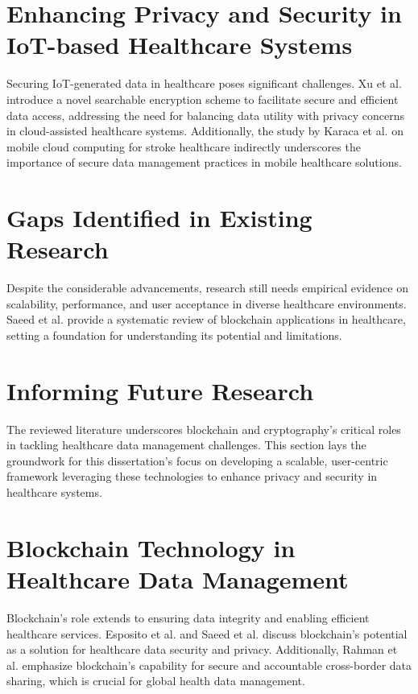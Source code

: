 \documentclass[cic,tc,english]{iiufrgs}
\begin{document}
\section{Enhancing Privacy and Security in IoT-based Healthcare Systems}
Securing IoT-generated data in healthcare poses significant challenges. Xu et al. \cite{XuChang2019} introduce a novel searchable encryption scheme to facilitate secure and efficient data access, addressing the need for balancing data utility with privacy concerns in cloud-assisted healthcare systems. Additionally, the study by Karaca et al. \cite{Karaca2019} on mobile cloud computing for stroke healthcare indirectly underscores the importance of secure data management practices in mobile healthcare solutions.

\section{Gaps Identified in Existing Research}
Despite the considerable advancements, research still needs empirical evidence on scalability, performance, and user acceptance in diverse healthcare environments. Saeed et al. \cite{Saeed2022} provide a systematic review of blockchain applications in healthcare, setting a foundation for understanding its potential and limitations.

\section{Informing Future Research}
The reviewed literature underscores blockchain and cryptography's critical roles in tackling healthcare data management challenges. This section lays the groundwork for this dissertation's focus on developing a scalable, user-centric framework leveraging these technologies to enhance privacy and security in healthcare systems.

\section{Blockchain Technology in Healthcare Data Management}
Blockchain's role extends to ensuring data integrity and enabling efficient healthcare services. Esposito et al. \cite{Esposito2018} and Saeed et al. \cite{Saeed2022} discuss blockchain's potential as a solution for healthcare data security and privacy. Additionally, Rahman et al. \cite{Rahman2020} emphasize blockchain's capability for secure and accountable cross-border data sharing, which is crucial for global health data management.
\end{document}
